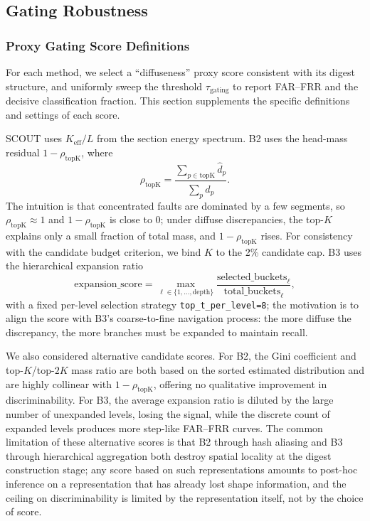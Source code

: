 \subsection{Gating Robustness}
\label{sec:appendix-comp-gating}

\subsubsection{Proxy Gating Score Definitions}
\label{sec:appendix-proxy-score}

For each method, we select a ``diffuseness'' proxy score consistent with its digest structure, and uniformly sweep the threshold $\tau_{\text{gating}}$ to report FAR--FRR and the decisive classification fraction. This section supplements the specific definitions and settings of each score.

SCOUT uses $K_{\text{eff}}/L$ from the section energy spectrum. B2 uses the head-mass residual $1-\rho_{\text{topK}}$, where
\[
  \rho_{\text{topK}}=\frac{\sum_{p\in \text{topK}}\hat{d}_p}{\sum_{p}\hat{d}_p}.
\]
The intuition is that concentrated faults are dominated by a few segments, so $\rho_{\text{topK}}\approx 1$ and $1-\rho_{\text{topK}}$ is close to 0; under diffuse discrepancies, the top-$K$ explains only a small fraction of total mass, and $1-\rho_{\text{topK}}$ rises. For consistency with the candidate budget criterion, we bind $K$ to the 2\% candidate cap. B3 uses the hierarchical expansion ratio
\[
  \text{expansion\_score}=\max_{\ell\in\{1,\dots,\text{depth}\}}\frac{\text{selected\_buckets}_\ell}{\text{total\_buckets}_\ell},
\]
with a fixed per-level selection strategy \texttt{top\_t\_per\_level=8}; the motivation is to align the score with B3's coarse-to-fine navigation process: the more diffuse the discrepancy, the more branches must be expanded to maintain recall.

We also considered alternative candidate scores. For B2, the Gini coefficient and top-$K$/top-$2K$ mass ratio are both based on the sorted estimated distribution and are highly collinear with $1-\rho_{\text{topK}}$, offering no qualitative improvement in discriminability. For B3, the average expansion ratio is diluted by the large number of unexpanded levels, losing the signal, while the discrete count of expanded levels produces more step-like FAR--FRR curves. The common limitation of these alternative scores is that B2 through hash aliasing and B3 through hierarchical aggregation both destroy spatial locality at the digest construction stage; any score based on such representations amounts to post-hoc inference on a representation that has already lost shape information, and the ceiling on discriminability is limited by the representation itself, not by the choice of score.

